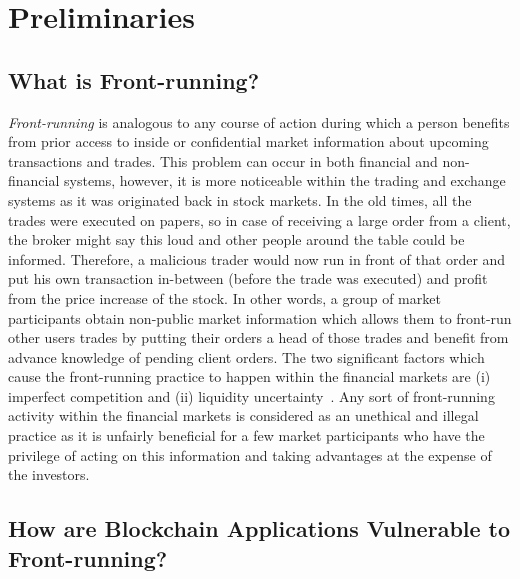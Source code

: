 \section{Preliminaries}

\subsection{What is Front-running?} %
\label{sec:What is front-running?}

\emph{Front-running} is analogous to any course of action during which a person benefits from prior access to inside or confidential market information about upcoming transactions and trades. This problem can occur in both financial and non-financial systems, however, it is more noticeable within the trading and exchange systems as it was originated back in stock markets. In the old times, all the trades were executed on papers, so in case of receiving a large order from a client, the broker might say this loud and other people around the table could be informed. Therefore, a malicious trader would now run in front of that order and put his own transaction in-between (before the trade was executed) and profit from the price increase of the stock. In other words, a group of market participants obtain non-public market information which allows them to front-run other users trades by putting their orders a head of those trades and benefit from advance knowledge of pending client orders. The two significant factors which cause the front-running practice to happen within the financial markets are (i) imperfect competition and (ii) liquidity uncertainty~\cite{liang2005distressed}. Any sort of front-running activity within the financial markets is considered as an unethical and illegal practice as it is unfairly beneficial for a few market participants who have the privilege of acting on this information and taking advantages at the expense of the investors. 


\subsection{How are Blockchain Applications Vulnerable to Front-running?} %
\label{sec:Front Running on the Blockchains}


